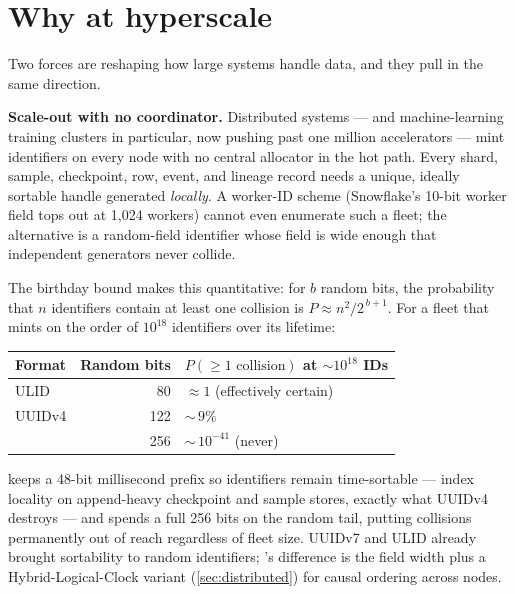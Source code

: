 \section{Why \tessera{} at hyperscale}
\label{sec:why-hyperscale}

Two forces are reshaping how large systems handle data, and they pull in the same direction.

\textbf{Scale-out with no coordinator.} Distributed systems --- and machine-learning training clusters in particular, now pushing past one million accelerators --- mint identifiers on every node with no central allocator in the hot path. Every shard, sample, checkpoint, row, event, and lineage record needs a unique, ideally sortable handle generated \emph{locally}. A worker-ID scheme (Snowflake's 10-bit worker field tops out at 1{,}024 workers) cannot even enumerate such a fleet; the alternative is a random-field identifier whose field is wide enough that independent generators never collide.

The birthday bound makes this quantitative: for $b$ random bits, the probability that $n$ identifiers contain at least one collision is $P \approx n^{2} / 2^{\,b+1}$. For a fleet that mints on the order of $10^{18}$ identifiers over its lifetime:

\begin{center}
\small
\begin{tabular}{@{}lrl@{}}
\toprule
\textbf{Format} & \textbf{Random bits} & \textbf{$P(\geq 1\text{ collision})$ at ${\sim}10^{18}$ IDs} \\
\midrule
ULID            & 80  & $\approx 1$ (effectively certain) \\
UUIDv4          & 122 & ${\sim}\,9\%$ \\
\tesseraid{}    & 256 & ${\sim}\,10^{-41}$ (never) \\
\bottomrule
\end{tabular}
\end{center}

\tesseraid{} keeps a 48-bit millisecond prefix so identifiers remain time-sortable --- index locality on append-heavy checkpoint and sample stores, exactly what UUIDv4 destroys --- and spends a full 256 bits on the random tail, putting collisions permanently out of reach regardless of fleet size. UUIDv7 and ULID already brought sortability to random identifiers; \tesseraid{}'s difference is the field width plus a Hybrid-Logical-Clock variant (\cref{sec:distributed}) for causal ordering across nodes.

